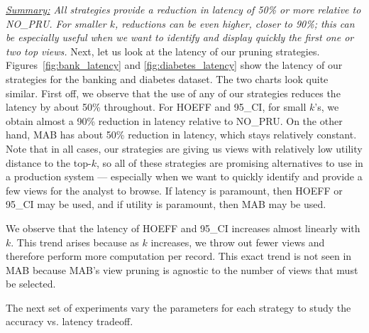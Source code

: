 
{\em \underline{Summary:} All strategies provide a reduction in latency of 50\% or more
relative to NO\_PRU. For smaller $k$, reductions can be even higher, closer to 90\%; this can be
especially useful when we want to identify and display quickly the first one or two top views.}
Next, let us look at the latency of our pruning strategies.
Figures~\ref{fig:bank_latency} and \ref{fig:diabetes_latency} show the latency
of our strategies for the banking and diabetes dataset.
The two charts look quite similar.
First off, we observe that the use of any of our strategies reduces the
latency by about 50\% throughout.
For HOEFF and 95\_CI, for small $k$'s, we obtain almost a 90\% reduction in
latency relative to NO\_PRU. 
On the other hand, MAB has about 50\% reduction in latency, which stays relatively
constant. 
Note that in all cases, our strategies are giving us views
with relatively low utility distance to the top-$k$,
so all of these strategies are promising alternatives to use 
in a production system --- especially when we want to quickly identify and provide a few 
views for the analyst to browse.
If latency is paramount, then HOEFF or 95\_CI may be used,
and if utility is paramount, then MAB may be used.


We observe that the latency of HOEFF and 95\_CI increases almost linearly
with $k$. This trend arises because as $k$
increases, we throw out fewer views and therefore perform more
computation per record.
This exact trend is not seen in MAB because MAB's view pruning is agnostic
to the number of views that must be selected.

The next set of experiments vary the parameters for each strategy to study
the accuracy vs. latency tradeoff.


